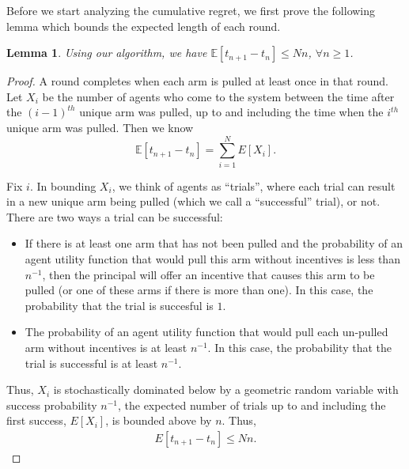 \documentclass{article}
\newtheorem{lemma}{Lemma}
\begin{document}
Before we start analyzing the cumulative regret, we first prove the following lemma which bounds the expected length of each round.

\begin{lemma}
Using our algorithm, we have $\mathbb{E}[t_{n+1}-t_{n}]\leq Nn$, $\forall n\geq 1$.
\label{round:length}
\end{lemma}


\begin{proof}
	A round completes when each arm is pulled at least once in that round. Let $X_{i}$ be the number of agents who come to the system between the time after the $(i-1)^{th}$ unique arm was pulled, up to and including the time when the $i^{th}$ unique arm was pulled. Then we know 
\begin{equation*}
\mathbb{E}[t_{n+1}-t_{n}]=\sum_{i=1}^{N}E[X_{i}].
\end{equation*}


Fix $i$. In bounding $X_i$, we think of agents as ``trials'', where each trial can result in a new unique arm being pulled (which we call a ``successful'' trial), or not.  There are two ways a trial can be successful:
\begin{itemize}
\item If there is at least one arm that has not been pulled and the probability of an agent utility function that would pull this arm without incentives is less than $n^{-1}$, then the principal will offer an incentive that causes this arm to be pulled (or one of these arms if there is more than one). In this case, the probability that the trial is succesful is $1$.  
\item The probability of an agent utility function that would pull each un-pulled arm without incentives is at least $n^{-1}$. In this case, the probability that the trial is successful is at least $n^{-1}$.
\end{itemize}

Thus, $X_{i}$ is stochastically dominated below by a geometric random variable with success probability $n^{-1}$, the expected number of trials up to and including the first success, $E[X_i]$, is bounded above by $n$.  Thus,
\begin{align}
E[t_{n+1}-t_{n}]\leq Nn. \nonumber
\end{align}
\end{proof}
\end{document}
